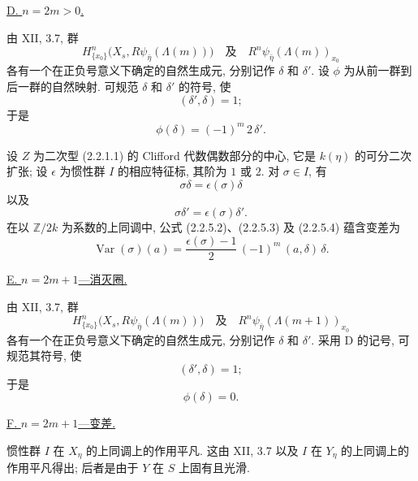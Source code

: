 \medskip
\noindent\underline{D. $n=2m>0$.}

由 XII, 3.7, 群
\[
H^n_{\{x_0\}}\bigl(X_s,R\psi_{\bar\eta}(\Lambda(m))\bigr)
\quad\text{及}\quad
R^n\psi_{\bar\eta}(\Lambda(m))_{x_0}
\]
各有一个在正负号意义下确定的自然生成元, 分别记作 $\delta$ 和 $\delta'$. 设 $\phi$ 为从前一群到后一群的自然映射. 可规范 $\delta$ 和 $\delta'$ 的符号, 使
\begin{equation}\tag{2.2.5.2}
(\delta',\delta)=1;
\end{equation}
于是
\begin{equation}\tag{2.2.5.3}
\phi(\delta)=(-1)^m\,2\,\delta'.
\end{equation}

设 $Z$ 为二次型 (2.2.1.1) 的 Clifford 代数偶数部分的中心, 它是 $k(\eta)$ 的可分二次扩张; 设 $\epsilon$ 为惯性群 $I$ 的相应特征标, 其阶为 $1$ 或 $2$. 对 $\sigma\in I$, 有
\begin{equation}\tag{2.2.5.4}
\sigma\delta=\epsilon(\sigma)\delta
\end{equation}
以及
\begin{equation}\tag{2.2.5.5}
\sigma\delta'=\epsilon(\sigma)\delta'.
\end{equation}
在以 $\mathbb Z/2k$ 为系数的上同调中, 公式 (2.2.5.2)、(2.2.5.3) 及 (2.2.5.4) 蕴含变差为
\begin{equation}\tag{2.2.5.6}
\operatorname{Var}(\sigma)(a)=
\frac{\epsilon(\sigma)-1}{2}\,(-1)^m\,(a,\delta)\,\delta.
\end{equation}

\medskip
\noindent\underline{E. $n=2m+1$---消灭圈.}

由 XII, 3.7, 群
\[
H^n_{\{x_0\}}\bigl(X_s,R\psi_{\bar\eta}(\Lambda(m))\bigr)
\quad\text{及}\quad
R^n\psi_{\bar\eta}(\Lambda(m+1))_{x_0}
\]
各有一个在正负号意义下确定的自然生成元, 分别记作 $\delta$ 和 $\delta'$. 采用 D 的记号, 可规范其符号, 使
\begin{equation}\tag{2.2.5.7}
(\delta',\delta)=1;
\end{equation}
于是
\begin{equation}\tag{2.2.5.8}
\phi(\delta)=0.
\end{equation}

\medskip
\noindent\underline{F. $n=2m+1$---变差.}

惯性群 $I$ 在 $X_\eta$ 的上同调上的作用平凡. 这由 XII, 3.7 以及 $I$ 在 $Y_\eta$ 的上同调上的作用平凡得出; 后者是由于 $Y$ 在 $S$ 上固有且光滑.

